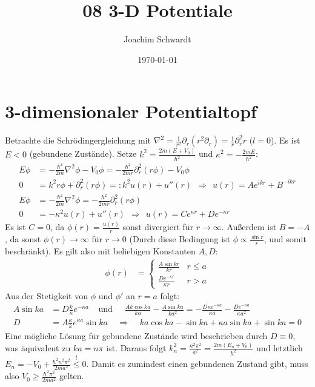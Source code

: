 \documentclass[a4paper,12pt]{article}
\newcommand{\tecxt}{}
\begin{document}
\title{08 3-D Potentiale}
\author{Joachim Schwardt}
\date{\today}
\maketitle

\section{3-dimensionaler Potentialtopf}
Betrachte die Schrödingergleichung mit $\nabla^2=\frac{1}{r^2}\partial_r(r^2\partial_r)=\frac{1}{r}\partial_r^2r$ ($l=0$). Es ist $E<0$ (gebundene Zustände). Setze $k^2=\frac{2m(E+V_0)}{\hbar^2}$ und $\kappa^2=-\frac{2mE}{\hbar^2}$:
\begin{align*}
E\phi &=-\frac{\hbar^2}{2m}\nabla^2\phi -V_0\phi =-\frac{\hbar^2}{2mr}\partial_r^2(r\phi)-V_0\phi\\
0&=k^2r\phi +\partial_r^2(r\phi)=:k^2u(r)+u''(r)\ \ \Rightarrow\ \ u(r)=Ae^{ikr} + B^{-ikr}\\
E\phi &=-\frac{\hbar^2}{2m}\nabla^2\phi=-\frac{\hbar^2}{2mr}\partial_r^2(r\phi) \\
0&=-\kappa^2u(r)+u''(r)\ \ \Rightarrow\ \ u(r)=Ce^{\kappa r}+De^{-\kappa r}
\end{align*}
Es ist $C=0$, da $\phi(r)=\frac{u(r)}{r}$ sonst divergiert für $r\rightarrow\infty$. Außerdem ist $B=-A$, da sonst $\phi(r)\rightarrow\infty$ für $r\rightarrow0$ (Durch diese Bedingung ist $\phi\propto\frac{\sin r}{r}$, und somit beschränkt). Es gilt also mit beliebigen Konstanten $A,D$:
\begin{align*}
\phi(r)&=\left\{\begin{matrix}
\frac{A\sin kr}{kr} & r\le a \\
\frac{De^{-\kappa r}}{\kappa r} & r> a
\end{matrix}\right.
\end{align*}
Aus der Stetigkeit von $\phi$ und $\phi'$ an $r=a$ folgt:
\begin{align*}
A\sin ka&=D\frac{k}{\kappa} e^{-\kappa a}\ \ \ \ \ \tecxt\text{und }\ \ \ \ \ \frac{Ak\cos ka}{ka}-\frac{A\sin ka}{ka^2}=-\frac{D\kappa e^{-\kappa a}}{\kappa a}-\frac{De^{-\kappa a}}{\kappa a^2}\\
D&=A\frac{\kappa}{k}e^{\kappa a}\sin ka\ \ \ \ \ \Rightarrow\ \ \ \ \  ka\cos ka-\sin ka+\kappa a\sin ka+\sin ka=0
\end{align*}
Eine mögliche Lösung für gebundene Zustände wird beschrieben durch $D\equiv 0$, was äquivalent zu $ka=n\pi$ ist. Daraus folgt $k_n^2=\frac{n^2\pi^2}{a^2}=\frac{2m(E_n+V_0)}{\hbar^2}$ und letztlich $E_n=-V_0+\frac{\hbar^2n^2\pi^2}{2ma^2}\overset{!}{\le}0$. Damit es zumindest einen gebundenen Zustand gibt, muss also $V_0\ge\frac{\hbar^2\pi^2}{2ma^2}$ gelten.
\end{document}
